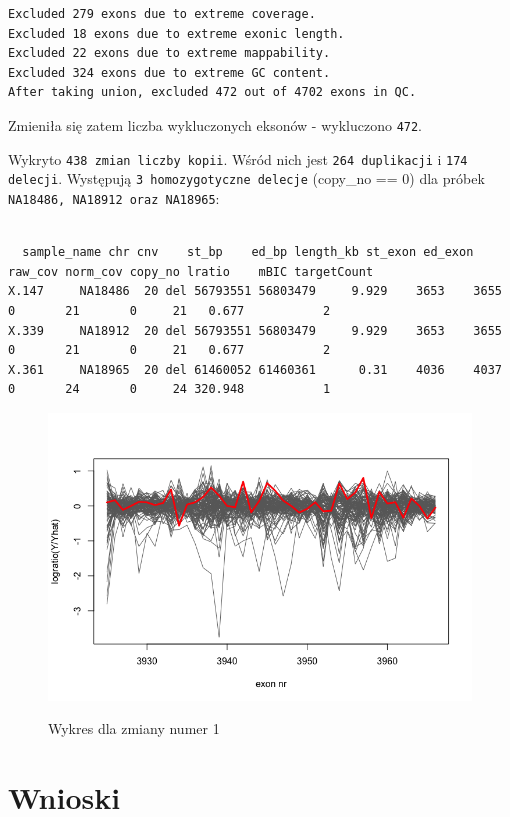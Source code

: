 \documentclass[a4paper]{article}
\begin{document}
\begin{verbatim}
Excluded 279 exons due to extreme coverage.
Excluded 18 exons due to extreme exonic length.
Excluded 22 exons due to extreme mappability.
Excluded 324 exons due to extreme GC content.
After taking union, excluded 472 out of 4702 exons in QC.
\end{verbatim}
Zmieniła się zatem liczba wykluczonych eksonów - wykluczono \texttt{472}.

Wykryto \texttt{438 zmian liczby kopii}. Wśród nich jest \texttt{264 duplikacji} i \texttt{174 delecji}.
Występują \texttt{3 homozygotyczne delecje} (copy\_no == 0) dla próbek \texttt{NA18486, NA18912 oraz NA18965}:
\begin{verbatim}

  sample_name chr cnv    st_bp    ed_bp length_kb st_exon ed_exon raw_cov norm_cov copy_no lratio    mBIC targetCount
X.147     NA18486  20 del 56793551 56803479     9.929    3653    3655       0       21       0     21   0.677           2
X.339     NA18912  20 del 56793551 56803479     9.929    3653    3655       0       21       0     21   0.677           2
X.361     NA18965  20 del 61460052 61460361      0.31    4036    4037       0       24       0     24 320.948           1
\end{verbatim}

\begin{figure}[h]
    \centering
    \includegraphics[width=1.0\textwidth]{plot_change_no_1.png}
    \label{fig:igv}
    \caption[]{Wykres dla zmiany numer 1}
\end{figure}

\section{Wnioski}
\end{document}
